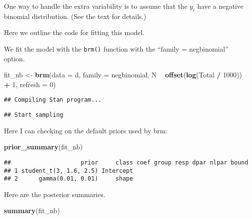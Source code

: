\documentclass[
]{book}
\newenvironment{Shaded}{\begin{snugshade}}{\end{snugshade}}
\newcommand{\DataTypeTok}[1]{\textcolor[rgb]{0.13,0.29,0.53}{#1}}
\newcommand{\DecValTok}[1]{\textcolor[rgb]{0.00,0.00,0.81}{#1}}
\newcommand{\KeywordTok}[1]{\textcolor[rgb]{0.13,0.29,0.53}{\textbf{#1}}}
\newcommand{\NormalTok}[1]{#1}
\newcommand{\OperatorTok}[1]{\textcolor[rgb]{0.81,0.36,0.00}{\textbf{#1}}}
\newcommand{\StringTok}[1]{\textcolor[rgb]{0.31,0.60,0.02}{#1}}
\begin{document}
One way to handle the extra variability is to assume that the \(y_i\) have a negative binomial distribution. (See the text for details.)

Here we outline the code for fitting this model.

We fit the model with the \texttt{brm()} function with the ``family = negbinomial'' option.

\begin{Shaded}
\begin{Highlighting}[]
\NormalTok{fit_nb <-}\StringTok{ }\KeywordTok{brm}\NormalTok{(}\DataTypeTok{data =}\NormalTok{ d, }\DataTypeTok{family =}\NormalTok{ negbinomial,}
\NormalTok{           N }\OperatorTok{~}\StringTok{ }\KeywordTok{offset}\NormalTok{(}\KeywordTok{log}\NormalTok{(Total }\OperatorTok{/}\StringTok{ }\DecValTok{1000}\NormalTok{)) }\OperatorTok{+}\StringTok{ }\DecValTok{1}\NormalTok{,}
           \DataTypeTok{refresh =} \DecValTok{0}\NormalTok{)}
\end{Highlighting}
\end{Shaded}

\begin{verbatim}
## Compiling Stan program...
\end{verbatim}

\begin{verbatim}
## Start sampling
\end{verbatim}

Here I can checking on the default priors used by brm:

\begin{Shaded}
\begin{Highlighting}[]
\KeywordTok{prior_summary}\NormalTok{(fit_nb)}
\end{Highlighting}
\end{Shaded}

\begin{verbatim}
##                    prior     class coef group resp dpar nlpar bound
## 1 student_t(3, 1.6, 2.5) Intercept                                 
## 2      gamma(0.01, 0.01)     shape
\end{verbatim}

Here are the posterior summaries.

\begin{Shaded}
\begin{Highlighting}[]
\KeywordTok{summary}\NormalTok{(fit_nb)}
\end{Highlighting}
\end{Shaded}
\end{document}
